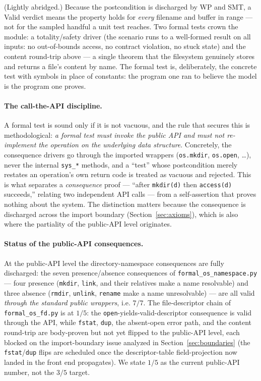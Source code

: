 \documentclass[11pt]{article}
\begin{document}
\noindent
(Lightly abridged.) Because the postcondition is discharged by WP and SMT, a
Valid verdict means the property holds for \emph{every} filename and buffer
in range --- not for the sampled handful a unit test reaches. Two formal
tests crown the module: a totality/safety driver (the scenario runs to a
well-formed result on all inputs: no out-of-bounds access, no contract
violation, no stuck state) and the content round-trip above --- a single
theorem that the filesystem genuinely stores and returns a file's content by
name. The formal test is, deliberately, the concrete test with symbols in
place of constants: the program one ran to believe the model is the program
one proves.

\paragraph{The call-the-API discipline.}
A formal test is sound only if it is not vacuous, and the rule that secures this
is methodological: \emph{a formal test must invoke the public API and must not
re-implement the operation on the underlying data structure}. Concretely, the
consequence drivers go through the imported wrappers (\texttt{os.mkdir},
\texttt{os.open}, \ldots), never the internal \texttt{sys\_*} methods, and a
``test'' whose postcondition merely restates an operation's own return code is
treated as vacuous and rejected. This is what separates a \emph{consequence}
proof --- ``after \texttt{mkdir(d)} then \texttt{access(d)} succeeds,''
relating two independent API calls --- from a self-assertion that proves
nothing about the system. The distinction matters because the consequence is
discharged across the import boundary (Section~\ref{sec:axioms}), which is also
where the partiality of the public-API level originates.

\paragraph{Status of the public-API consequences.}
At the public-API level the directory-namespace consequences are fully
discharged: the seven presence/absence consequences of
\texttt{formal\_os\_namespace.py} --- four presence (\texttt{mkdir},
\texttt{link}, and their relatives make a name resolvable) and three absence
(\texttt{rmdir}, \texttt{unlink}, \texttt{rename} make a name unresolvable)
--- are all valid \emph{through the standard public wrappers}, i.e. $7/7$. The
file-descriptor chain of \texttt{formal\_os\_fd.py} is at $1/5$: the
\texttt{open}-yields-valid-descriptor consequence is valid through the API,
while \texttt{fstat}, \texttt{dup}, the absent-open error path, and the
content round-trip are body-proven but not yet flipped to the public-API level,
each blocked on the import-boundary issue analyzed in
Section~\ref{sec:boundaries} (the \texttt{fstat}/\texttt{dup} flips are
scheduled once the descriptor-table field-projection now landed in the front
end propagates). We state $1/5$ as the
current public-API number, not the $3/5$ target.
\end{document}
